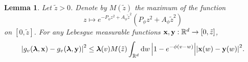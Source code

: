 \documentclass[11pt]{article}
\newcommand{\R}{\mathbb R}
\newcommand{\bl}{\bm{\lambda}}
\newcommand{\bx}{\vb{x}}
\newcommand{\by}{\vb{y}}
\newcommand{\aconst}{A_{\phi}}
\newcommand{\pconst}{P_{\phi}}
\numberwithin{equation}{section}
\theoremstyle{plain}
\newtheorem{lemma}[theorem]{Lemma}
\theoremstyle{definition}
\theoremstyle{remark}
\begin{document}
\begin{lemma}
\label{lem:contraction-properties_real-contraction_single-iteration}
Let $\tilde{z}>0$.
Denote by $M(\tilde{z})$ the maximum of the function
\begin{equation}
\label{eqn:contraction-properties_real-contraction_single-iteration_coefficient-function}
z\mapsto e^{-\pconst z^{2}+\aconst \tilde{z}^{2}}(\pconst z^{2}+\aconst \tilde{z}^{2})
\end{equation} 
on $[0,\tilde{z}]$.
For any Lebesgue measurable functions $\bx,\by:\R^{d}\rightarrow[0,\tilde{z}]$,
\begin{equation}
\abs{g_{v}(\bl,\bx)-g_{v}(\bl,\by)}^{2}
\le\bl(v)M(\tilde{z})\int_{\R^{d}}\dd{w}\abs{1-e^{-\phi(v-w)}}\abs{\bx(w)-\by(w)}^{2}.
\end{equation}
\end{lemma}
\end{document}
